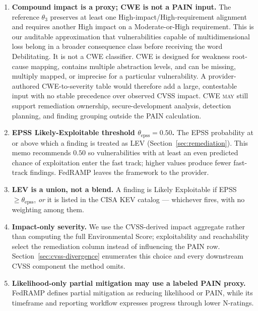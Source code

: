 \documentclass[11pt]{article}
\newcommand{\rfckw}[1]{\textsc{#1}}
\begin{document}
\begin{enumerate}[leftmargin=1.7em]
  consequences, disclose the active policy to affected agencies, and version the
  complete calibration. Thresholds \rfckw{must not} be changed ad hoc after seeing
  a finding's deadline. They should also remain independent of Certification Class:
  Class selects the response commitment after potential impact is derived.
\item \textbf{Compound impact is a proxy; CWE is not a PAIN input.}
  The reference $\theta_3$ preserves at least one High-impact/High-requirement
  alignment and requires another High impact on a Moderate-or-High requirement.
  This is our auditable approximation that vulnerabilities capable of
  multidimensional loss belong in a broader consequence class before receiving the
  word Debilitating. It is not a CWE classifier. CWE is designed for weakness
  root-cause mapping, contains multiple abstraction levels, and can be missing,
  multiply mapped, or imprecise for a particular vulnerability. A provider-authored
  CWE-to-severity table would therefore add a large, contestable input with no
  stable precedence over observed CVSS impact. CWE \rfckw{may} still support
  remediation ownership, secure-development analysis, detection planning, and
  finding grouping outside the PAIN calculation.
\item \textbf{EPSS Likely-Exploitable threshold $\theta_{\text{epss}} = 0.50$.}
  The EPSS probability at or above which a finding is treated as LEV
  (Section~\ref{sec:remediation}). This memo recommends $0.50$ so vulnerabilities
  with at least an even predicted chance of exploitation enter the fast track;
  higher values produce fewer fast-track findings. FedRAMP leaves the framework
  to the provider.
\item \textbf{LEV is a union, not a blend.} A finding is Likely Exploitable if
  EPSS $\ge \theta_{\text{epss}}$, \emph{or} it is listed in the CISA KEV catalog ---
  whichever fires, with no weighting among them.
\item \textbf{Impact-only severity.} We use the CVSS-derived impact aggregate rather
  than computing the full Environmental Score; exploitability and reachability
  select the remediation column instead of influencing the PAIN row.
  Section~\ref{sec:cvss-divergence} enumerates this choice and every downstream CVSS
  component the method omits.
\item \textbf{Likelihood-only partial mitigation may use a labeled PAIN proxy.}
  FedRAMP defines partial mitigation as reducing likelihood or PAIN, while its
  timeframe and reporting workflow expresses progress through lower N-ratings.

\end{enumerate}
\end{document}
